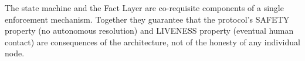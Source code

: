The state machine and the Fact Layer are co-requisite components of a single enforcement mechanism. Together they guarantee that the protocol's SAFETY property (no autonomous resolution) and LIVENESS property (eventual human contact) are consequences of the architecture, not of the honesty of any individual node.
